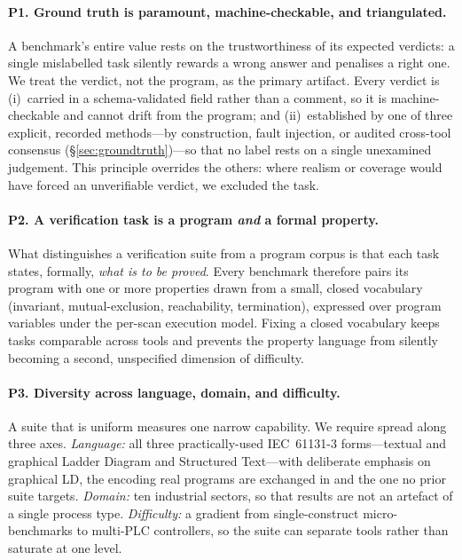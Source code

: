 \paragraph{P1. Ground truth is paramount, machine-checkable, and triangulated.}
A benchmark's entire value rests on the trustworthiness of its expected verdicts: a single
mislabelled task silently rewards a wrong answer and penalises a right one. We treat the
verdict, not the program, as the primary artifact. Every verdict is (i)~carried in a
schema-validated field rather than a comment, so it is machine-checkable and cannot drift
from the program; and (ii)~established by one of three explicit, recorded methods---by
construction, fault injection, or audited cross-tool consensus (\S\ref{sec:groundtruth})---so
that no label rests on a single unexamined judgement. This principle overrides the others:
where realism or coverage would have forced an unverifiable verdict, we excluded the task.

\paragraph{P2. A verification task is a program \emph{and} a formal property.}
What distinguishes a verification suite from a program corpus is that each task states,
formally, \emph{what is to be proved}. Every benchmark therefore pairs its program with one
or more properties drawn from a small, closed vocabulary (invariant, mutual-exclusion,
reachability, termination), expressed over program variables under the per-scan execution
model. Fixing a closed vocabulary keeps tasks comparable across tools and prevents the
property language from silently becoming a second, unspecified dimension of difficulty.

\paragraph{P3. Diversity across language, domain, and difficulty.}
A suite that is uniform measures one narrow capability. We require spread along three axes.
\emph{Language:} all three practically-used IEC~61131-3 forms---textual and graphical Ladder
Diagram and Structured Text---with deliberate emphasis on graphical LD, the encoding real
programs are exchanged in and the one no prior suite targets. \emph{Domain:} ten industrial
sectors, so that results are not an artefact of a single process type. \emph{Difficulty:} a
gradient from single-construct micro-benchmarks to multi-PLC controllers, so the suite can
separate tools rather than saturate at one level.

